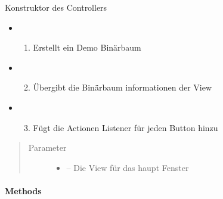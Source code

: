 \documentclass[letterpaper,10pt,ngerman]{sphinxmanual}
\begin{document}
\begin{fulllineitems}
\label{\detokenize{com/linuxluigi/edu/Controller:com.linuxluigi.edu.Controller.Controller(View)}}
Konstruktor des Controllers
\begin{itemize}
\item {} \begin{enumerate}
\item {} 
Erstellt ein Demo Binärbaum

\end{enumerate}

\item {} \begin{enumerate}
\setcounter{enumi}{1}
\item {} 
Übergibt die Binärbaum informationen der View

\end{enumerate}

\item {} \begin{enumerate}
\setcounter{enumi}{2}
\item {} 
Fügt die Actionen Listener für jeden Button hinzu

\end{enumerate}

\end{itemize}
\begin{quote}\begin{description}
\item[{Parameter}] \leavevmode\begin{itemize}
\item {} 
 -- Die View für das haupt Fenster

\end{itemize}

\end{description}\end{quote}

\end{fulllineitems}



\paragraph{Methods}
\label{\detokenize{com/linuxluigi/edu/Controller:methods}}
\end{document}
